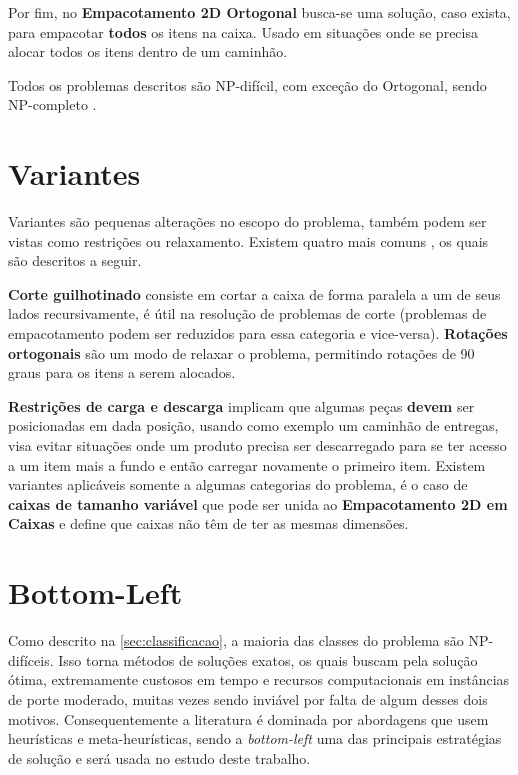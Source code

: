 Por fim, no \textbf{Empacotamento 2D Ortogonal} busca-se uma solução, caso exista, para empacotar \textbf{todos} os itens na caixa.
Usado em situações onde se precisa alocar todos os itens dentro de um caminhão.

Todos os problemas descritos são NP-difícil, com exceção do Ortogonal, sendo NP-completo \cite{2DPackLib}.


\section{Variantes}\label{sec:variantes}


Variantes são pequenas alterações no escopo do problema, também podem ser vistas como restrições ou relaxamento.
Existem quatro mais comuns \cite{2DPackLib}, os quais são descritos a seguir.

\textbf{Corte guilhotinado} consiste em cortar a caixa de forma paralela a um de seus lados recursivamente, é útil na resolução de problemas de corte (problemas de empacotamento podem ser reduzidos para essa categoria e vice-versa).
\textbf{Rotações ortogonais} são um modo de relaxar o problema, permitindo rotações de 90 graus para os itens a serem alocados.

\textbf{Restrições de carga e descarga} implicam que algumas peças \textbf{devem} ser posicionadas em dada posição, usando como exemplo um caminhão de entregas, visa evitar situações onde um produto precisa ser descarregado para se ter acesso a um item mais a fundo e então carregar novamente o primeiro item.
Existem variantes aplicáveis somente a algumas categorias do problema, é o caso de \textbf{caixas de tamanho variável}  que pode ser unida ao \textbf{Empacotamento 2D em Caixas} e define que caixas não têm de ter as mesmas dimensões.


\section{Bottom-Left}\label{sec:bottom-left}

Como descrito na \autoref{sec:classificacao}, a maioria das classes do problema são NP-difíceis.
Isso torna métodos de soluções exatos, os quais buscam pela solução ótima, extremamente custosos em tempo e recursos computacionais em instâncias de porte moderado, muitas vezes sendo inviável por falta de algum desses dois motivos.
Consequentemente a literatura é dominada por abordagens que usem heurísticas e meta-heurísticas, sendo a \textit{bottom-left} uma das principais estratégias de solução e será usada no estudo deste trabalho.

